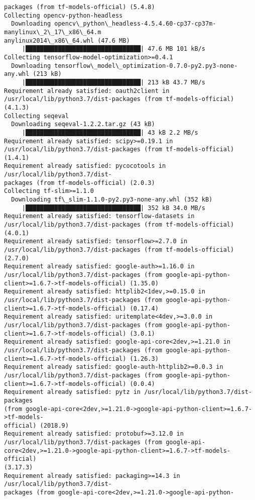 \documentclass[11pt]{article}
\begin{document}
\begin{Verbatim}[commandchars=\\\{\}]
packages (from tf-models-official) (5.4.8)
Collecting opencv-python-headless
  Downloading opencv\_python\_headless-4.5.4.60-cp37-cp37m-manylinux\_2\_17\_x86\_64.m
anylinux2014\_x86\_64.whl (47.6 MB)
     |████████████████████████████████| 47.6 MB 101 kB/s
Collecting tensorflow-model-optimization>=0.4.1
  Downloading tensorflow\_model\_optimization-0.7.0-py2.py3-none-any.whl (213 kB)
     |████████████████████████████████| 213 kB 43.7 MB/s
Requirement already satisfied: oauth2client in
/usr/local/lib/python3.7/dist-packages (from tf-models-official) (4.1.3)
Collecting seqeval
  Downloading seqeval-1.2.2.tar.gz (43 kB)
     |████████████████████████████████| 43 kB 2.2 MB/s
Requirement already satisfied: scipy>=0.19.1 in
/usr/local/lib/python3.7/dist-packages (from tf-models-official) (1.4.1)
Requirement already satisfied: pycocotools in /usr/local/lib/python3.7/dist-
packages (from tf-models-official) (2.0.3)
Collecting tf-slim>=1.1.0
  Downloading tf\_slim-1.1.0-py2.py3-none-any.whl (352 kB)
     |████████████████████████████████| 352 kB 34.0 MB/s
Requirement already satisfied: tensorflow-datasets in
/usr/local/lib/python3.7/dist-packages (from tf-models-official) (4.0.1)
Requirement already satisfied: tensorflow>=2.7.0 in
/usr/local/lib/python3.7/dist-packages (from tf-models-official) (2.7.0)
Requirement already satisfied: google-auth>=1.16.0 in
/usr/local/lib/python3.7/dist-packages (from google-api-python-
client>=1.6.7->tf-models-official) (1.35.0)
Requirement already satisfied: httplib2<1dev,>=0.15.0 in
/usr/local/lib/python3.7/dist-packages (from google-api-python-
client>=1.6.7->tf-models-official) (0.17.4)
Requirement already satisfied: uritemplate<4dev,>=3.0.0 in
/usr/local/lib/python3.7/dist-packages (from google-api-python-
client>=1.6.7->tf-models-official) (3.0.1)
Requirement already satisfied: google-api-core<2dev,>=1.21.0 in
/usr/local/lib/python3.7/dist-packages (from google-api-python-
client>=1.6.7->tf-models-official) (1.26.3)
Requirement already satisfied: google-auth-httplib2>=0.0.3 in
/usr/local/lib/python3.7/dist-packages (from google-api-python-
client>=1.6.7->tf-models-official) (0.0.4)
Requirement already satisfied: pytz in /usr/local/lib/python3.7/dist-packages
(from google-api-core<2dev,>=1.21.0->google-api-python-client>=1.6.7->tf-models-
official) (2018.9)
Requirement already satisfied: protobuf>=3.12.0 in
/usr/local/lib/python3.7/dist-packages (from google-api-
core<2dev,>=1.21.0->google-api-python-client>=1.6.7->tf-models-official)
(3.17.3)
Requirement already satisfied: packaging>=14.3 in /usr/local/lib/python3.7/dist-
packages (from google-api-core<2dev,>=1.21.0->google-api-python-

\end{Verbatim}
\end{document}
